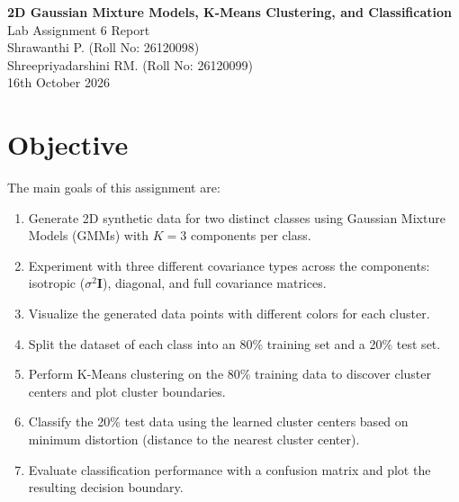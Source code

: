 \documentclass[11pt,a4paper]{article}
\begin{document}
\begin{center}
{\LARGE \textbf{2D Gaussian Mixture Models, K-Means Clustering, and Classification}}\\[6pt]
{\large Lab Assignment 6 Report}\\[6pt]
Shrawanthi P. (Roll No: 26120098)\\
Shreepriyadarshini RM. (Roll No: 26120099)\\[4pt]
16th October 2026
\end{center}

\section{Objective}
The main goals of this assignment are:
\begin{enumerate}
  \item Generate 2D synthetic data for two distinct classes using Gaussian Mixture Models (GMMs) with $K=3$ components per class.
  \item Experiment with three different covariance types across the components: isotropic ($\sigma^2 \mathbf{I}$), diagonal, and full covariance matrices.
  \item Visualize the generated data points with different colors for each cluster.
  \item Split the dataset of each class into an 80\% training set and a 20\% test set.
  \item Perform K-Means clustering on the 80\% training data to discover cluster centers and plot cluster boundaries.
  \item Classify the 20\% test data using the learned cluster centers based on minimum distortion (distance to the nearest cluster center).
  \item Evaluate classification performance with a confusion matrix and plot the resulting decision boundary.
\end{enumerate}
\end{document}
